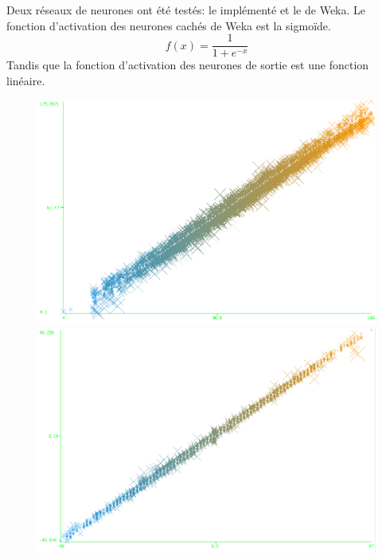Deux réseaux de neurones ont été testés: le \rbf implémenté et le \mlp de Weka.
Le fonction d'activation des neurones cachés de Weka est la sigmoïde.
\[ f(x) = \frac{1}{1+e^{-x}} \]
Tandis que la fonction d'activation des neurones de sortie est une fonction linéaire.\cite{mlpweka}

\begin{figure}
 \begin{minipage}[c]{\mpwekawidth}
  \includegraphics[width=\textwidth]{../figures/virtualResultSpeed.png}
 \end{minipage}
 \begin{minipage}[c]{\mpwekawidth}
  \includegraphics[width=\textwidth]{../figures/virtualHeadResult.png}
 \end{minipage}
 \label{we:virtualResult}
\end{figure}
